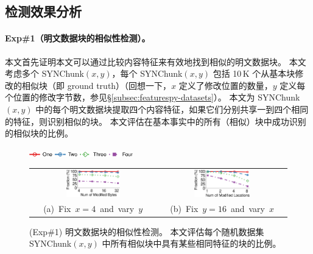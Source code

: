 \subsection{检测效果分析}
\label{subsec:featurespy-evaluation-detection}



\paragraph*{Exp\#1（明文数据块的相似性检测）。}
本文首先证明本文可以通过比较内容特征来有效地找到相似的明文数据块。 本文考虑多个 SYNChunk$(x, y)$，每个 SYNChunk$(x, y)$ 包括 10\,K 个从基本块修改的相似块（即 ground truth）（回想一下，$x$ 定义了修改位置的数量，$y$ 定义每个位置的修改字节数，参见\S\ref{subsec:featurespy-datasets}）。 本文为 SYNChunk$(x, y)$ 中的每个明文数据块提取四个内容特征，如果它们分别共享一到四个相同的特征，则识别相似的块。 本文评估在基本事实中的所有（相似）块中成功识别的相似块的比例。


\begin{figure}[!htb]
    \centering
    \includegraphics[width=0.4\textwidth]{pic/featurespy/plot/detection/syn/fixed_pq_legend.pdf}
    \vspace{5pt}\\
    \begin{tabular}{@{\ }c@{\ }c}
        \includegraphics[width=0.45\textwidth]{pic/featurespy/plot/detection/syn/fixed_p_4.pdf} &
        \includegraphics[width=0.45\textwidth]{pic/featurespy/plot/detection/syn/fixed_q_16.pdf}\\
        \mbox{\small (a) Fix $x=4$ and vary $y$}&
        \mbox{\small (b) Fix $y=16$ and vary $x$}\\
    \end{tabular}
    \vspace{-6pt}
    \caption{(Exp\#1) 明文数据块的相似性检测。 本文评估每个随机数据集 SYNChunk$(x, y)$ 中所有相似块中具有某些相同特征的块的比例。}
    \vspace{-6pt}
    \label{fig:featurespy-expDetectionSynSim}
\end{figure}

